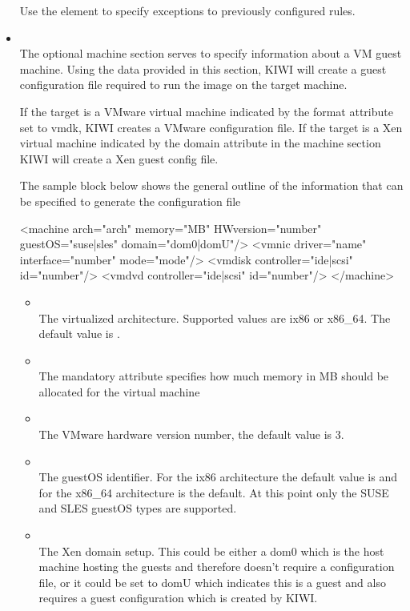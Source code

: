 \begin{itemize}
    Use the  element to specify exceptions to previously
    configured rules.

\item {}\\
    The optional machine section serves to specify information
    about a VM guest machine. Using the data provided in this section,
    KIWI will create a guest configuration file required to run the
    image on the target machine.

    If the target is a VMware virtual machine indicated by the
    format attribute set to vmdk, KIWI creates a VMware configuration file.
    If the target is a Xen virtual machine indicated by the domain
    attribute in the machine section KIWI will create a Xen guest
    config file.

    The sample block below shows the general outline of the information
    that can be specified to generate the configuration file

\begin{xml}
<machine arch="arch" memory="MB" HWversion="number"
         guestOS="suse|sles" domain="dom0|domU"/>
  <vmnic driver="name" interface="number" mode="mode"/>
  <vmdisk controller="ide|scsi" id="number"/>
  <vmdvd controller="ide|scsi" id="number"/>
</machine>
\end{xml}

	\begin{itemize}
	\item {}\\
      The virtualized architecture. Supported values are ix86 or x86\_64.
      The default value is .
	\item {}\\
      The mandatory  attribute specifies how much memory in MB
      should be allocated for the virtual machine
	\item {}\\
      The VMware hardware version number, the default value is 3.
	\item {}\\
      The guestOS identifier. For the ix86 architecture the default 
      value is  and for the x86\_64 architecture
       is the default. At this point only the SUSE and
      SLES guestOS types are supported.
	\item {}\\
      The Xen domain setup. This could be either a dom0 which is the
      host machine hosting the guests and therefore doesn't require a
      configuration file, or it could be set to domU which indicates
      this is a guest and also requires a guest configuration which is
      created by KIWI.
	\end{itemize}


\end{itemize}
